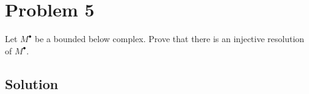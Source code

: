 \section*{Problem 5}

Let \(M^\bullet\) be a bounded below complex.
Prove that there is an injective resolution of \(M^\bullet\).

\subsection*{Solution}